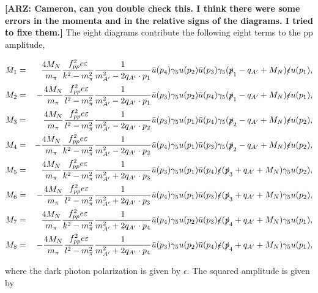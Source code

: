 \documentclass[nofootinbib,prd,superscriptaddress,twocolumn]{revtex4}
\newcommand{\qa}{q_{A'}}
\newcommand{\arz}[1]{{{\bf{\color{BrickRed}[ARZ: #1]}}}}
\begin{document}
\arz{Cameron, can you double check this. I think there were some errors in the momenta and in the relative 
signs of the diagrams. I tried to fixe them.}
The eight diagrams contribute the following eight terms to the pp amplitude, 
%
\begin{widetext}
\begin{eqnarray}
	M_1 &=& \frac{4 M_N}{ m_\pi} \frac{f_{pp}^2 e \varepsilon}{k^2-m_\pi^2}  \frac{1}{m_{A^\prime}^2 - 2 \qa \cdot p_1} 
	\bar{u}(p_4) \gamma_5 u(p_2) \bar{u}(p_3) \gamma_5 (\slashed{p}_1 - \qa +M_N)\slashed \epsilon  u(p_1), \\
	M_2 &=& -\frac{4 M_N}{ m_\pi} \frac{f_{pp}^2 e \varepsilon}{l^2-m_\pi^2}  \frac{1}{m_{A^\prime}^2 - 2 \qa \cdot p_1} 
	\bar{u}(p_3) \gamma_5 u(p_2) \bar{u}(p_4) \gamma_5 (\slashed{p}_1 - \qa +M_N)\slashed{\epsilon} u(p_1),\\
	M_3 &=& \frac{4 M_N}{ m_\pi} \frac{f_{pp}^2 e \varepsilon}{l^2-m_\pi^2}  \frac{1}{m_{A^\prime}^2 - 2 \qa \cdot p_2} 
	\bar{u}(p_3) \gamma_5 u(p_1) \bar{u}(p_4) \gamma_5 (\slashed{p}_2 - \qa +M_N)\slashed \epsilon  u(p_2), \\
	M_4 &=& -\frac{4 M_N}{ m_\pi} \frac{f_{pp}^2 e \varepsilon}{k^2-m_\pi^2}  \frac{1}{m_{A^\prime}^2 - 2 \qa \cdot p_2} 
	\bar{u}(p_4) \gamma_5 u(p_1) \bar{u}(p_3) \gamma_5 (\slashed{p}_2 - \qa +M_N)\slashed \epsilon  u(p_2), \\
	M_5 &=& \frac{4 M_N}{ m_\pi} \frac{f_{pp}^2 e \varepsilon}{k^2-m_\pi^2}  \frac{1}{m_{A^\prime}^2 + 2 \qa \cdot p_3} 
	\bar{u}(p_3) \gamma_5 u(p_1) \bar{u}(p_4) \slashed{\epsilon} (\slashed{p}_3 + \qa +M_N)\gamma_5 u(p_2),\\
	M_6 &=& -\frac{4 M_N}{ m_\pi} \frac{f_{pp}^2 e \varepsilon}{l^2-m_\pi^2}  \frac{1}{m_{A^\prime}^2 + 2 \qa \cdot p_3} 
	\bar{u}(p_4) \gamma_5 u(p_1) \bar{u}(p_3) \slashed{\epsilon} (\slashed{p}_3 + \qa +M_N)\gamma_5 u(p_2),\\
	M_7 &=& \frac{4 M_N}{ m_\pi} \frac{f_{pp}^2 e \varepsilon}{k^2-m_\pi^2}  \frac{1}{m_{A^\prime}^2 + 2 \qa \cdot p_4} 
	\bar{u}(p_4) \gamma_5 u(p_2) \bar{u}(p_3) \slashed{\epsilon} (\slashed{p}_4 + \qa +M_N)\gamma_5 u(p_1),\\
	M_8 &=& -\frac{4 M_N}{ m_\pi} \frac{f_{pp}^2 e \varepsilon}{l^2-m_\pi^2}  \frac{1}{m_{A^\prime}^2 + 2 \qa \cdot p_4} 
	\bar{u}(p_3) \gamma_5 u(p_2) \bar{u}(p_4) \slashed{\epsilon} (\slashed{p}_4 + \qa +M_N)\gamma_5 u(p_1),
\end{eqnarray}
\end{widetext}
%
where the dark photon polarization is given by $\epsilon$. The squared amplitude is given by 
\end{document}
